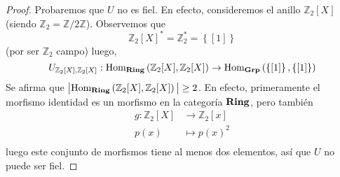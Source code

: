 \documentclass[12pt]{report}
\theoremstyle{largebreak}
\newcommand\abs[1]{\ensuremath{\big|#1\big|}}
\newcommand{\Hom}[3]{\ensuremath{\textup{Hom}_{#1}\left(#2,#3\right)}}
\newcommand{\Cat}[1]{\ensuremath{\textup{\textbf{#1}}}}
\begin{document}
    \begin{proof}
        Probaremos que $U$ no es fiel. En efecto, consideremos el anillo
        $\mathbb{Z}_2[X]$ (siendo $\mathbb{Z}_2=\mathbb{Z}/2\mathbb{Z}$). Observemos que
        \begin{equation*}
            \mathbb{Z}_2[X]^*=\mathbb{Z}_2^*=\left\{[1]\right\}
        \end{equation*}
        (por ser $\mathbb{Z}_2$ campo) luego,
        \begin{equation*}
            U_{\mathbb{Z}_2[X],\mathbb{Z}_2[X]}:\Hom{\Cat{Ring}}{\mathbb{Z}_2[X]}{\mathbb{Z}_2[X]}\rightarrow\Hom{\Cat{Grp}}{\left\{[1]\right\}}{\left\{[1]\right\}}
        \end{equation*}
        Se afirma que $\abs{\Hom{\Cat{Ring}}{\mathbb{Z}_2[X]}{\mathbb{Z}_2[X]}}\geq 2$. En efecto, primeramente el morfismo identidad es un morfismo en la categoría $\Cat{Ring}$, pero también
        \begin{equation*}
            \begin{split}
                g:\mathbb{Z}_2[X]&\rightarrow\mathbb{Z}_2[x]\\
                p(x)&\mapsto p(x)^2\\
            \end{split}
        \end{equation*}
        luego este conjunto de morfismos tiene al menos dos elementos, así que $U$ no puede ser fiel.


\end{proof}
\end{document}
